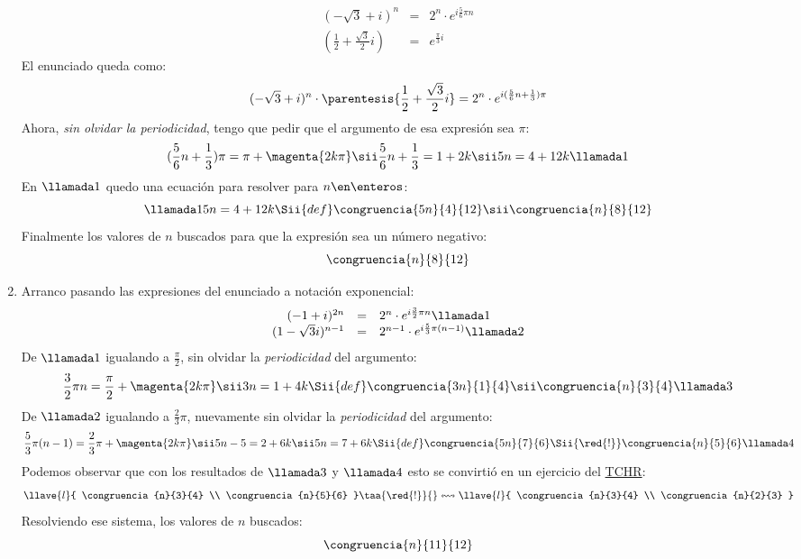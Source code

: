 \begin{enumerate}[label=\roman*)]
        $$
          \begin{array}{rcl}
            (-\sqrt3 + i)^n                   & = & 2^n \cdot e^{i\frac{5}{6}\pi n} \\
            (\frac{1}{2} + \frac{\sqrt3}{2}i) & = & e^{\frac{\pi}{3}i}
          \end{array}
        $$
        El enunciado queda como:
        $$
          (-\sqrt3 + i)^n \cdot \parentesis{\frac{1}{2} + \frac{\sqrt3}{2}i} = 2^n \cdot e^{i (\frac{5}{6}n + \frac{1}{3})\pi }
        $$
        Ahora, \textit{sin olvidar la periodicidad}, tengo que pedir que el argumento de esa expresión sea $\pi$:
        $$
          (\frac{5}{6}n + \frac{1}{3})\pi = \pi + \magenta{2k\pi}
          \sii
          \frac{5}{6}n + \frac{1}{3} = 1 + 2k
          \sii
          5n = 4 + 12k\llamada1
        $$
        En $\llamada1$ quedo una ecuación para resolver para $n \en \enteros$:
        $$
          \llamada1
          5n = 4 + 12k
          \Sii{def}
          \congruencia{5n}{4}{12}
          \sii
          \congruencia{n}{8}{12}
        $$
        Finalmente los valores de $n$ buscados para que la expresión sea un número negativo:
        $$
          \congruencia{n}{8}{12}
        $$

  \item Arranco pasando las expresiones del enunciado a notación exponencial:
        $$
          \begin{array}{rcl}
            (-1 + i)^{2n}        & = & 2^n \cdot e^{i\frac{3}{2}\pi n} \llamada1          \\
            (1 - \sqrt3 i)^{n-1} & = & 2^{n-1}\cdot e^{i \frac{5}{3}\pi (n-1) } \llamada2
          \end{array}
        $$
        De $\llamada1$ igualando a $\frac{\pi}{2}$, sin olvidar la \textit{periodicidad} del argumento:
        $$
          \frac{3}{2} \pi n = \frac{\pi}{2} + \magenta{2k\pi}
          \sii
          3 n = 1 + 4k
          \Sii{def}
          \congruencia{3n}{1}{4}
          \sii
          \congruencia{n}{3}{4} \llamada3
        $$
        De $\llamada2$ igualando a $\frac{2}{3}\pi$, nuevamente sin olvidar la \textit{periodicidad} del argumento:
        $$
          \frac{5}{3} \pi (n-1) = \frac{2}{3}\pi + \magenta{2k\pi}
          \sii
          5 n - 5 = 2 + 6k
          \sii
          5 n = 7 + 6k
          \Sii{def}
          \congruencia{5n}{7}{6}
          \Sii{\red{!}}
          \congruencia{n}{5}{6} \llamada4
        $$
        Podemos observar que con los resultados de $\llamada3$ y $\llamada4$ esto se convirtió en un ejercicio del \href{\chinito}{TCHR}:
        $$
          \llave{l}{
            \congruencia{n}{3}{4} \\
            \congruencia{n}{5}{6}
          }
          \taa{\red{!}}{}\leftrightsquigarrow
          \llave{l}{
            \congruencia{n}{3}{4} \\
            \congruencia{n}{2}{3}
          }
        $$
        Resolviendo ese sistema, los valores de $n$ buscados:
        $$
          \congruencia{n}{11}{12}
        $$
\end{enumerate}

\begin{aportes}
  \item {}
\end{aportes}
